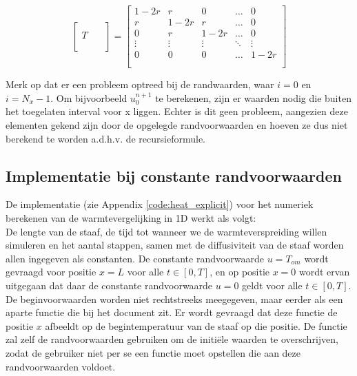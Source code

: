 \documentclass[a4paper,kulak]{kulakarticle} %
\begin{document}
\begin{equation}
	\begin{bmatrix}
		\qquad \\
		T \\
		\\ 
	\end{bmatrix}
	=
	\begin{bmatrix}
		1-2r	&	r		&	0		&	\dots	&	0 		\\
		r		&	1-2r	&	r		&	\dots	&	0		\\
		0		&	r		&	1-2r	&	\dots	&	0		\\
		\vdots	&	\vdots	&	\vdots	&	\ddots	&	\vdots	\\
		0		&	0		&	0		&	\dots	&	1-2r	\\
		\\ 
	\end{bmatrix}
\end{equation}

Merk op dat er een probleem optreed bij de randwaarden, waar $i = 0$ en $i = N_x-1$. Om bijvoorbeeld $u_0^{n+1}$ te berekenen, zijn er waarden nodig die buiten het toegelaten interval voor x liggen. Echter is dit geen probleem, aangezien deze elementen gekend zijn door de opgelegde randvoorwaarden en hoeven ze dus niet berekend te worden a.d.h.v. de recursieformule.

\subsection{Implementatie bij constante randvoorwaarden}
\label{sec:impl_expl_constant}

De implementatie  (zie Appendix \ref{code:heat_explicit}) voor het numeriek berekenen van de warmtevergelijking in 1D werkt als volgt: \\
De lengte van de staaf, de tijd tot wanneer we de warmteverspreiding willen simuleren en het aantal stappen, samen met de diffusiviteit van de staaf worden allen ingegeven als constanten. De constante randvoorwaarde $u = T_{om}$ wordt gevraagd voor positie $x = L$ voor alle $t \in [0, T]$, en op positie $x = 0$ wordt ervan uitgegaan dat daar de constante randvoorwaarde $u = 0$ geldt voor alle $t \in [0, T]$. De beginvoorwaarden worden niet rechtstreeks meegegeven, maar eerder als een aparte functie  die bij het document zit. Er wordt gevraagd dat deze functie de positie $x$ afbeeldt op de begintemperatuur van de staaf op die positie. De functie  zal zelf de randvoorwaarden gebruiken om de initiële waarden te overschrijven, zodat de gebruiker niet per se een functie moet opstellen die aan deze randvoorwaarden voldoet.
\end{document}
